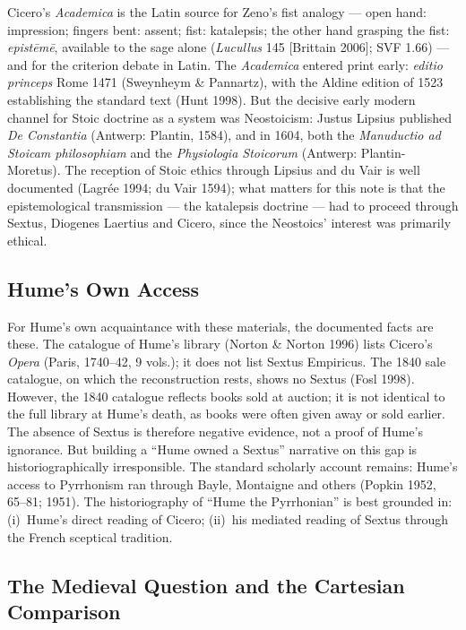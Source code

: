 \documentclass[11pt]{article}
\theoremstyle{plain}
\theoremstyle{definition}
\theoremstyle{remark}
\begin{document}
Cicero's \emph{Academica} is the Latin source for Zeno's fist analogy
--- open hand: impression; fingers bent: assent; fist: katalepsis; the
other hand grasping the fist: \emph{epist\=em\=e}, available to the
sage alone (\emph{Lucullus} 145 [Brittain 2006]; SVF 1.66) --- and for
the criterion debate in Latin. The \emph{Academica} entered print
early: \emph{editio princeps} Rome 1471 (Sweynheym \& Pannartz), with
the Aldine edition of 1523 establishing the standard text (Hunt 1998).
But the decisive early modern channel for Stoic doctrine as a system
was Neostoicism: Justus Lipsius published \emph{De Constantia} (Antwerp:
Plantin, 1584), and in 1604, both the \emph{Manuductio ad Stoicam
philosophiam} and the \emph{Physiologia Stoicorum} (Antwerp:
Plantin-Moretus). The reception of Stoic ethics through Lipsius and du
Vair is well documented (Lagr\'ee 1994; du Vair 1594); what matters for
this note is that the epistemological transmission --- the katalepsis
doctrine --- had to proceed through Sextus, Diogenes Laertius and
Cicero, since the Neostoics' interest was primarily ethical.

\subsection{Hume's Own Access}

For Hume's own acquaintance with these materials, the documented facts
are these. The catalogue of Hume's library (Norton \& Norton 1996)
lists Cicero's \emph{Opera} (Paris, 1740--42, 9 vols.); it does not
list Sextus Empiricus. The 1840 sale catalogue, on which the
reconstruction rests, shows no Sextus (Fosl 1998). However, the 1840
catalogue reflects books sold at auction; it is not identical to the
full library at Hume's death, as books were often given away or sold
earlier. The absence of Sextus is therefore negative evidence, not a
proof of Hume's ignorance. But building a ``Hume owned a Sextus''
narrative on this gap is historiographically irresponsible. The
standard scholarly account remains: Hume's access to Pyrrhonism ran
through Bayle, Montaigne and others (Popkin 1952, 65--81; 1951). The
historiography of ``Hume the Pyrrhonian'' is best grounded in:
(i)~Hume's direct reading of Cicero; (ii)~his mediated reading of
Sextus through the French sceptical tradition.

\subsection{The Medieval Question and the Cartesian Comparison}
\end{document}

